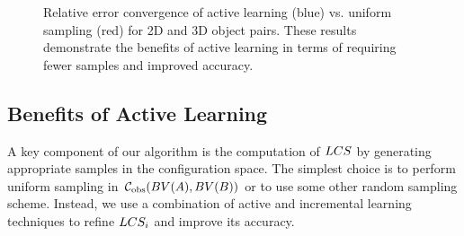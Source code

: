 \begin{figure}[!h]
\begin{center}
\end{center}
\caption[Relative error convergence of active learning vs. uniform sampling for 2D and 3D object pairs]{Relative error convergence of active learning (blue) vs. uniform sampling (red) for 2D and 3D object pairs. These results demonstrate the benefits of active learning in terms of requiring fewer samples and improved accuracy.}
\label{fig:2:activelearningtime}
\end{figure}

\subsection{Benefits of Active Learning}
A key component of our algorithm is the computation of $LCS$ by generating appropriate samples in the configuration space. The simplest choice is to perform uniform sampling in $\mathcal C_{\text{obs}} (BV(A),BV(B))$ or to use some other random sampling scheme. Instead, we use a combination of active and incremental learning techniques to refine $LCS_i$ and improve its accuracy.


